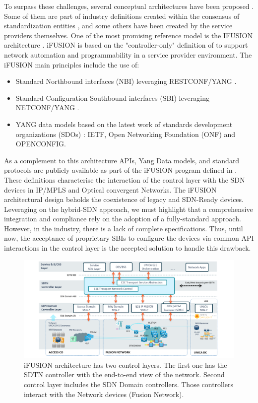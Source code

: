 \documentclass[a4paper,fleqn]{cas-dc}
\begin{document}
To surpass these challenges, several conceptual architectures have been proposed \cite{vissicchio2014opportunities,vissicchio2017safe}. Some of them are part of industry definitions created within the consensus of standardization entities \cite{lee2015requirements}, and some others have been created by the service providers themselves. One of the most promising reference model is the \uppercase{iFUSION} architecture \cite{contreras2019ifusion}. iFUSION is based on the "controller-only" definition of \cite{sinha2017survey} to support network automation and programmability in a service provider environment. The i\uppercase{FUSION} main principles include the use of:
\begin{itemize}
    \item Standard Northbound interfaces (NBI) leveraging \uppercase{RESTCONF/YANG} \cite{bierman2017RESTCONF}.
    \item Standard Configuration Southbound interfaces (SBI) leveraging \uppercase{NETCONF/YANG} \cite{enns2011network}.
    \item YANG data models based on the latest work of  standards development organizations (SDOs) \cite{bjorklund2016yang}: \uppercase{IETF}, Open Networking Foundation (ONF)  and \uppercase{OpenConfig}.
\end{itemize}

As a complement to this architecture APIs, Yang Data models, and standard protocols are publicly available as part of the i\uppercase{FUSION} program  defined in  \cite{apistelefonica}. These definitions characterise the interaction of the control layer with the SDN devices in IP/MPLS and Optical convergent Networks. 
The iFUSION architectural design beholds the coexistence of legacy and SDN-Ready devices. Leveraging on the hybrid-SDN approach, we must highlight that a comprehensive integration and compliance rely on the adoption of a fully-standard approach. However,  in the industry, there is a lack of complete specifications. Thus, until now, the acceptance of proprietary SBIs to configure the devices via common API interactions in the control layer is the accepted solution to handle this drawback.

\begin{figure}
	\centering
		\includegraphics[width=\linewidth]{figs/ifusion_architecture.png}
	\caption{i\uppercase{FUSION} architecture has two control layers. The first one has the SDTN controller with the end-to-end view of the network. Second control layer includes the SDN Domain controllers. Those controllers interact with the Network devices (Fusion Network).}
	\label{FIG:1}
\end{figure}
\end{document}
